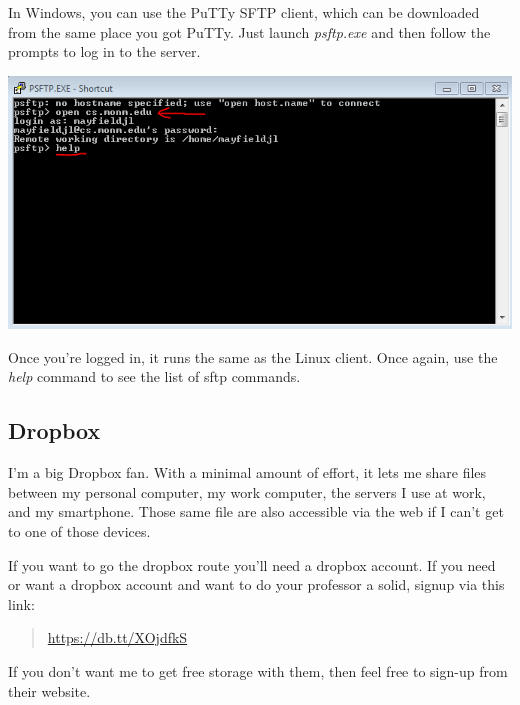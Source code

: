 \documentclass[]{tufte-handout}
\begin{document}
In Windows, you can use the PuTTy SFTP client, which can be downloaded from the same place you got PuTTy. Just launch \textit{psftp.exe} and then follow the prompts to log in to the server. 

\vspace{.1in}
\begin{center}
\includegraphics[scale=.75]{PSFTP-loginAndHelp.png}
\end{center}
\vspace{.1in}

Once you're logged in, it runs the same as the Linux client. Once again, use the \textit{help} command to see the list of sftp commands. 

\subsection{Dropbox}

I'm a big Dropbox fan. With a minimal amount of effort, it lets me share files between my personal computer, my work computer, the servers I use at work, and my smartphone.  Those same file are also accessible via the web if I can't get to one of those devices.

If you want to go the dropbox route you'll need a dropbox account. If you need or want a dropbox account and want to do your professor a solid, signup via this link:
\begin{quote}
\url{https://db.tt/XOjdfkS}
\end{quote}
If you don't want me to get free storage with them, then feel free to sign-up from their website. 
\end{document}
